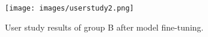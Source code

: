 \begin{figure}
\centering
\texttt{[image: images/userstudy2.png]}
\caption{User study results of group B after model fine-tuning.}
\label{fig:userstudy2}
\end{figure}